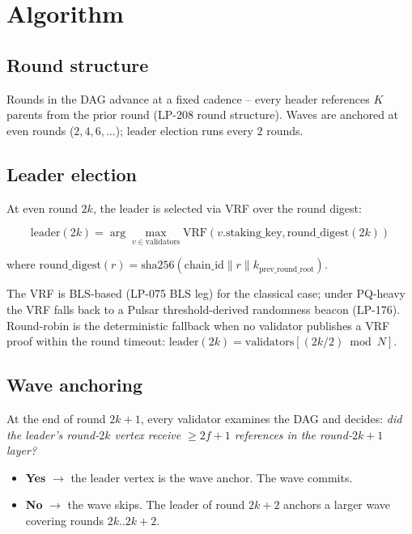 \section{Algorithm}
\label{sec:algorithm}

\subsection{Round structure}

Rounds in the DAG advance at a fixed cadence -- every header
references $K$ parents from the prior round (LP-208 round
structure). Waves are anchored at even rounds ($2, 4, 6, \ldots$);
leader election runs every $2$ rounds.

\subsection{Leader election}

At even round $2k$, the leader is selected via VRF over the round
digest:

\begin{equation}
\textrm{leader}(2k) = \arg\max_{v \in \textrm{validators}}
\textrm{VRF}(v.\textrm{staking\_key}, \textrm{round\_digest}(2k))
\end{equation}

where
$\textrm{round\_digest}(r) = \textrm{sha256}(\textrm{chain\_id} \| r \| k_{\textrm{prev\_round\_root}})$.

The VRF is BLS-based (LP-075 BLS leg) for the classical case; under
PQ-heavy the VRF falls back to a Pulsar threshold-derived
randomness beacon (LP-176). Round-robin is the deterministic
fallback when no validator publishes a VRF proof within the round
timeout: $\textrm{leader}(2k) = \textrm{validators}[(2k/2) \bmod N]$.

\subsection{Wave anchoring}

At the end of round $2k{+}1$, every validator examines the DAG and
decides: \emph{did the leader's round-$2k$ vertex receive
$\geq 2f{+}1$ references in the round-$2k{+}1$ layer?}

\begin{itemize}[leftmargin=2em,nosep]
\item \textbf{Yes} $\to$ the leader vertex is the wave anchor. The
  wave commits.
\item \textbf{No} $\to$ the wave skips. The leader of round $2k{+}2$
  anchors a larger wave covering rounds $2k..2k{+}2$.
\end{itemize}

